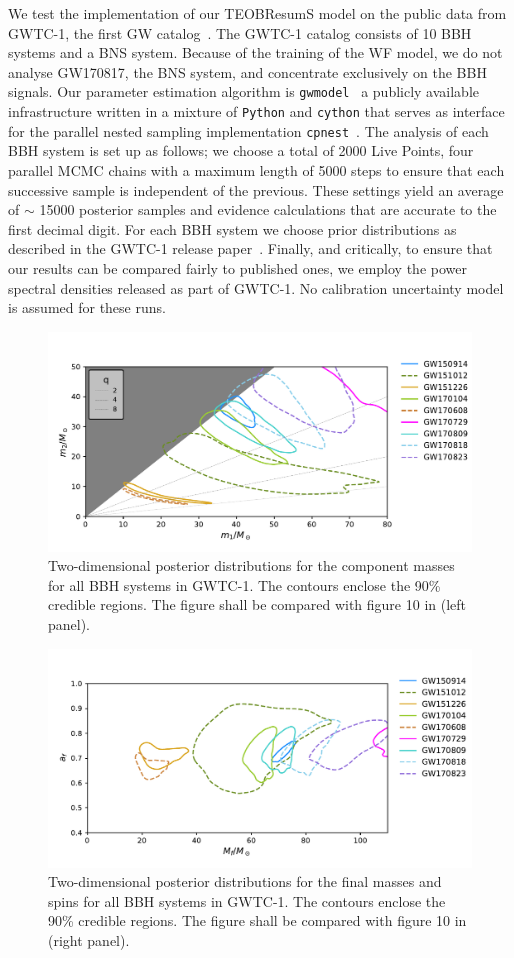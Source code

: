 We test the implementation of our TEOBResumS model on the public data from GWTC-1, the first GW catalog~\cite{}. 
The GWTC-1 catalog consists of 10 BBH systems and a BNS system. Because of the training of the WF model, we do not analyse GW170817, the BNS system, and concentrate exclusively on the BBH signals. Our parameter estimation algorithm is \texttt{gwmodel}~\cite{} a publicly available infrastructure 
written in a mixture of \texttt{Python} and \texttt{cython} that serves as interface for the parallel nested sampling implementation \texttt{cpnest}~\cite{}. 
The analysis of each BBH system is set up as follows; we choose a total of 2000 Live Points, four parallel MCMC chains with a maximum length of 5000 steps to ensure that each successive sample is independent of the previous. These settings yield an average of $\sim$ 15000 posterior samples and 
evidence calculations that are accurate to the first decimal digit. For each BBH system we choose prior distributions as described in the GWTC-1 release paper~\cite{}. Finally, and critically, to ensure that our results can be compared fairly to published ones, we employ the power spectral densities released as part of GWTC-1. No calibration uncertainty model is assumed for these runs. 
\begin{figure}[]
	\centering
    \includegraphics[width=.75\linewidth]{img/posterior_masses_source.pdf}
	\caption{
Two-dimensional posterior distributions for the component masses for all BBH systems in GWTC-1. The contours enclose the 90\% credible regions.
The figure shall be compared with figure 10 in \cite{Abbott_2019_GWTC} (left panel).
}
	\label{fig:summary-masses}
\end{figure}

\begin{figure}[]
	\centering
    \includegraphics[width=.75\linewidth]{img/final_spin_mass.pdf}
	\caption{
Two-dimensional posterior distributions for the final masses and spins for all BBH systems in GWTC-1. The contours enclose the 90\% credible regions.
The figure shall be compared with figure 10 in \cite{Abbott_2019_GWTC} (right panel).
}
	\label{fig:summary-final-state}
\end{figure}

